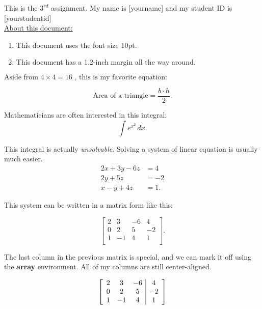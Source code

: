 \documentclass[10pt]{article}
\begin{document}
This is the $3^{rd}$ assignment. My name is [yourname] and my student ID is [yourstudentid]\\
\underline{About this document:}

\begin{enumerate}
\item This document uses the font size 10pt.
\item This document has a 1.2-inch margin all the way around.
\end{enumerate}

$ \mbox{Aside from } 4 \times 4 = 16 \mbox{ , this is my favorite equation:}$


\begin{equation}
\mbox{Area of a triangle} = \frac{b \cdot h}{2}.
\end{equation}


Mathematicians are often interested in this integral:
$$ \int e^{x^{2}} \, dx.$$

\noindent This integral is actually \textit{unsolvable}. Solving a system of linear equation is usually much easier.
\begin{align}
2x + 3y - 6z &= 4\\
2y + 5z &= -2\\
x - y + 4z &= 1.
\end{align}




\noindent This system can be written in a matrix form like this:

$$
\begin{bmatrix} 
 2 &  3 & -6 &  4\\
 0 &  2 &  5 & -2\\
 1 & -1 &  4 &  1\\
\end{bmatrix}
.$$

The last column in the previous matrix is special, and we can mark it off using the \textbf{array} environment. All of my columns are still center-aligned.

$$
\begin{bmatrix}
\begin{array}{c c c|c}
2 & 3 & -6 & 4\\
0 & 2 & 5 & -2\\
1 & -1 & 4 & 1
\end{array}
\end{bmatrix}
$$
\end{document}
